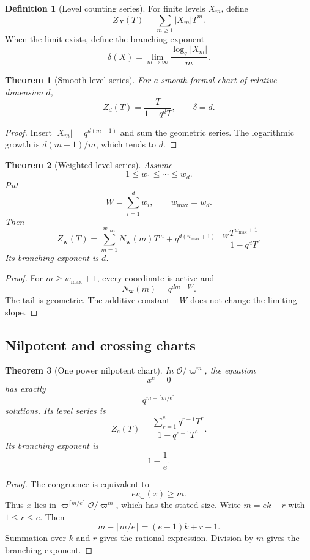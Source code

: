 \documentclass{aomart}
\newtheorem{theorem}{Theorem}[section]
\theoremstyle{definition}
\newtheorem{definition}[definition]{Definition}
\theoremstyle{remark}
\newcommand{\OO}{\mathcal O}
\newcommand{\abs}[1]{\left\lvert#1\right\rvert}
\begin{document}
\begin{definition}[Level counting series]\label{def:level_series}
For finite levels \(X_m\), define
\[
Z_X(T)
=
\sum_{m\geq1}\abs{X_m}T^m.
\]
When the limit exists, define the branching exponent
\[
\delta(X)
=
\lim_{m\to\infty}
\frac{\log_q\abs{X_m}}{m}.
\]
\end{definition}

\begin{theorem}[Smooth level series]\label{thm:smooth_level_series}
For a smooth formal chart of relative dimension \(d\),
\[
\boxed{
Z_d(T)
=
\frac{T}{1-q^dT},
\qquad
\delta=d.
}
\]
\end{theorem}

\begin{proof}
Insert \(\abs{X_m}=q^{d(m-1)}\) and sum the geometric series. The logarithmic growth is \(d(m-1)/m\), which tends to \(d\).
\end{proof}

\begin{theorem}[Weighted level series]\label{thm:weighted_level_series}
Assume
\[
1\leq w_1\leq\cdots\leq w_d.
\]
Put
\[
W=\sum_{i=1}^{d}w_i,
\qquad
w_{\max}=w_d.
\]
Then
\[
\boxed{
Z_{\bm w}(T)
=
\sum_{m=1}^{w_{\max}}
N_{\bm w}(m)T^m
+
q^{d(w_{\max}+1)-W}
\frac{T^{w_{\max}+1}}{1-q^dT}.
}
\]
Its branching exponent is \(d\).
\end{theorem}

\begin{proof}
For \(m\geq w_{\max}+1\), every coordinate is active and
\[
N_{\bm w}(m)=q^{dm-W}.
\]
The tail is geometric. The additive constant \(-W\) does not change the limiting slope.
\end{proof}

\subsection{Nilpotent and crossing charts}

\begin{theorem}[One power nilpotent chart]\label{thm:power_nilpotent}
In \(\OO/\varpi^m\), the equation
\[
x^e=0
\]
has exactly
\[
\boxed{
q^{m-\lceil m/e\rceil}
}
\]
solutions. Its level series is
\[
\boxed{
Z_e(T)
=
\frac{\sum_{r=1}^{e}q^{r-1}T^r}
{1-q^{e-1}T^e}.
}
\]
Its branching exponent is
\[
\boxed{
1-\frac1e.
}
\]
\end{theorem}

\begin{proof}
The congruence is equivalent to
\[
e v_{\varpi}(x)\geq m.
\]
Thus \(x\) lies in \(\varpi^{\lceil m/e\rceil}\OO/\varpi^m\), which has the stated size. Write \(m=ek+r\) with \(1\leq r\leq e\). Then
\[
m-\lceil m/e\rceil
=(e-1)k+r-1.
\]
Summation over \(k\) and \(r\) gives the rational expression. Division by \(m\) gives the branching exponent.
\end{proof}
\end{document}
